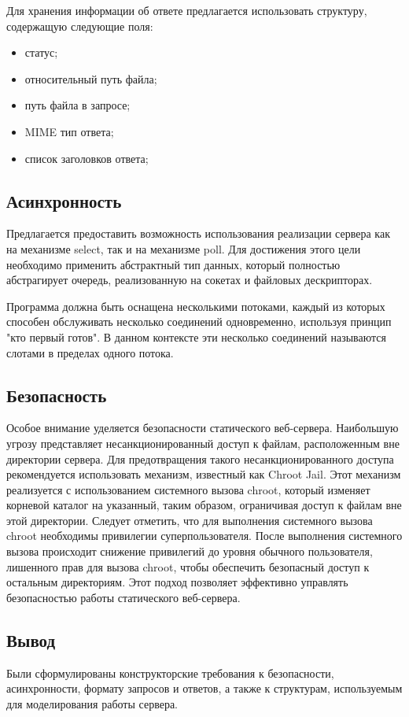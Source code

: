 Для хранения информации об ответе предлагается использовать структуру, содержащую следующие поля:

\begin{itemize}
    \item статус;
    \item относительный путь файла;
    \item путь файла в запросе;
    \item MIME тип ответа;
    \item список заголовков ответа;
\end{itemize}

\subsection{Асинхронность}

Предлагается предоставить возможность использования реализации сервера как на механизме select, так и на механизме poll. Для достижения этого цели необходимо применить абстрактный тип данных, который полностью абстрагирует очередь, реализованную на сокетах и файловых дескрипторах.

Программа должна быть оснащена несколькими потоками, каждый из которых способен обслуживать несколько соединений одновременно, используя принцип "кто первый готов". В данном контексте эти несколько соединений называются слотами в пределах одного потока.

\subsection{Безопасность}

Особое внимание уделяется безопасности статического веб-сервера. Наибольшую угрозу представляет несанкционированный доступ к файлам, расположенным вне директории сервера. Для предотвращения такого несанкционированного доступа рекомендуется использовать механизм, известный как Chroot Jail. Этот механизм реализуется с использованием системного вызова chroot, который изменяет корневой каталог на указанный, таким образом, ограничивая доступ к файлам вне этой директории. Следует отметить, что для выполнения системного вызова chroot необходимы привилегии суперпользователя. После выполнения системного вызова происходит снижение привилегий до уровня обычного пользователя, лишенного прав для вызова chroot, чтобы обеспечить безопасный доступ к остальным директориям. Этот подход позволяет эффективно управлять безопасностью работы статического веб-сервера.

\subsection{Вывод}

Были сформулированы конструкторские требования к безопасности, асинхронности, формату запросов и ответов, а также к структурам, используемым для моделирования работы сервера.